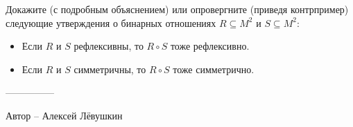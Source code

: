 \question
Докажите (с подробным объяснением) или опровергните (приведя контрпример) следующие утверждения о бинарных отношениях $R \subseteq M^2$ и $S \subseteq M^2$:
\begin{itemize}
    \item Если $R$ и $S$ рефлексивны, то $R \circ S$ тоже рефлексивно.
    \item Если $R$ и $S$ симметричны, то $R \circ S$ тоже симметрично.
\end{itemize}

---------------

Автор -- Алексей Лёвушкин